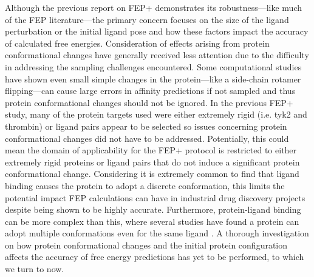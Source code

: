 \documentclass[journal=jctcce,manuscript=article]{achemso}
\begin{document}
Although the previous report on FEP+\cite{FEPplus} demonstrates its robustness---like much of the FEP literature---the primary concern focuses on the size of the ligand perturbation or the initial ligand pose and how these factors impact the accuracy of calculated free energies.\cite{mobley2012perspective,doi:10.1021/acs.jctc.5b00214}
Consideration of effects arising from protein conformational changes have generally received less attention due to the difficulty in addressing the sampling challenges encountered.
Some computational studies have shown even small simple changes in the protein---like a side-chain rotamer flipping---can cause large errors in affinity predictions if not sampled\cite{Mobley2009489,Mobley20071118} and thus protein conformational changes should not be ignored.
In the previous FEP+ study\cite{FEPplus}, many of the protein targets used were either extremely rigid (i.e. tyk2 and thrombin) or ligand pairs appear to be selected so issues concerning protein conformational changes did not have to be addressed.
Potentially, this could mean the domain of applicability for the FEP+ protocol is restricted to either extremely rigid proteins or ligand pairs that do not induce a significant protein conformational change.
Considering it is extremely common to find that ligand binding causes the protein to adopt a discrete conformation, this limits the potential impact FEP calculations can have in industrial drug discovery projects despite being shown to be highly accurate.
Furthermore, protein-ligand binding can be more complex than this, where several studies have found a protein can adopt multiple conformations even for the same ligand \cite{doi:10.1021/jm060167o,Gutteridge200521,Merski2015}.
A thorough investigation on how protein conformational changes and the initial protein configuration affects the accuracy of free energy predictions has yet to be performed, to which we turn to now.
\end{document}
